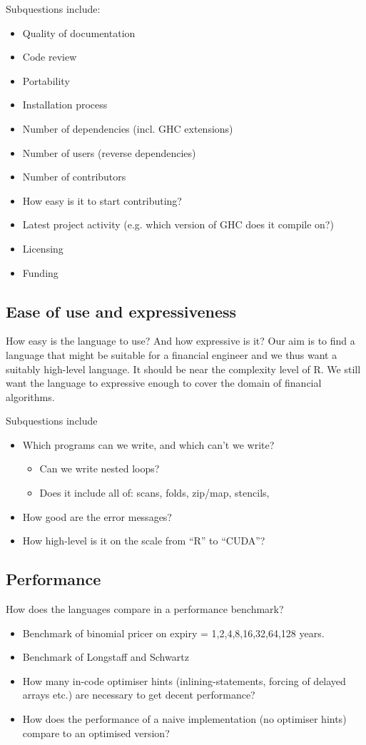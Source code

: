 Subquestions include:
\begin{itemize}
\item Quality of documentation
\item Code review
\item Portability
\item Installation process
\item Number of dependencies (incl. GHC extensions)
\item Number of users (reverse dependencies)
\item Number of contributors
\item How easy is it to start contributing?
\item Latest project activity (e.g. which version of GHC does it compile on?)
\item Licensing
\item Funding
\end{itemize}

\subsection{Ease of use and expressiveness}

How easy is the language to use? And how expressive is it? Our
aim is to find a language that might be suitable for a financial
engineer and we thus want a suitably high-level language. It should
be near the complexity level of R. We still want the language to
expressive enough to cover the domain of financial algorithms.

Subquestions include
\begin{itemize}
\item Which programs can we write, and which can't we write?
  \begin{itemize}
  \item Can we write nested loops?
  \item Does it include all of: scans, folds, zip/map, stencils,
  \end{itemize}
\item How good are the error messages?
\item How high-level is it on the scale from ``R'' to ``CUDA''?
\end{itemize}

\subsection{Performance} How does the languages compare in a
performance benchmark?
\begin{itemize}
\item Benchmark of binomial pricer on expiry = 1,2,4,8,16,32,64,128 years.
\item Benchmark of Longstaff and Schwartz
\item How many in-code optimiser hints (inlining-statements, forcing
  of delayed arrays etc.) are necessary to get decent performance?
\item How does the performance of a naive implementation (no
  optimiser hints) compare to an optimised version?
\end{itemize}


